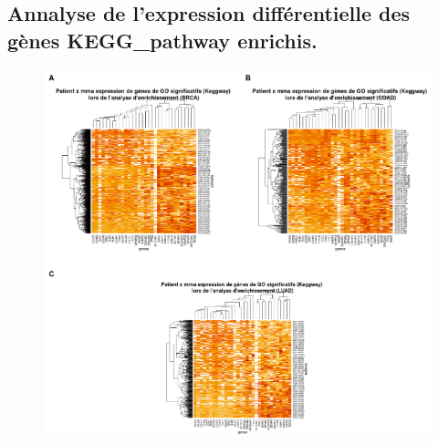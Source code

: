 \documentclass{style}
\begin{document}
\subsection{Annalyse de l'expression différentielle des gènes 
KEGG\_pathway enrichis.}\label{appendix:eatmap}
\begin{figure}[H]
    \centering
    \includegraphics[width=16cm]{images/figures/eatmaps.png}
\end{figure}
\end{document}
